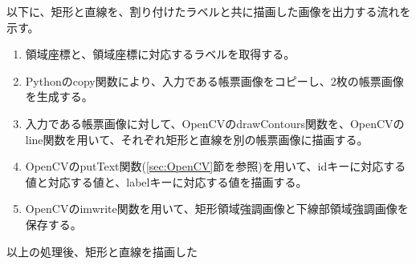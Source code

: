 以下に、矩形と直線を、割り付けたラベルと共に描画した画像を出力する流れを示す。

\begin{enumerate}
    \item 領域座標と、領域座標に対応するラベルを取得する。
    \item Pythonのcopy関数により、入力である帳票画像をコピーし、2枚の帳票画像を生成する。
    \item 入力である帳票画像に対して、OpenCVのdrawContours関数を、OpenCVのline関数を用いて、それぞれ矩形と直線を別の帳票画像に描画する。
    \item OpenCVのputText関数(\ref{sec:OpenCV}節を参照)を用いて、idキーに対応する値と対応する値と、labelキーに対応する値を描画する。
    \item OpenCVのimwrite関数を用いて、矩形領域強調画像と下線部領域強調画像を保存する。
\end{enumerate}


以上の処理後、矩形と直線を描画した